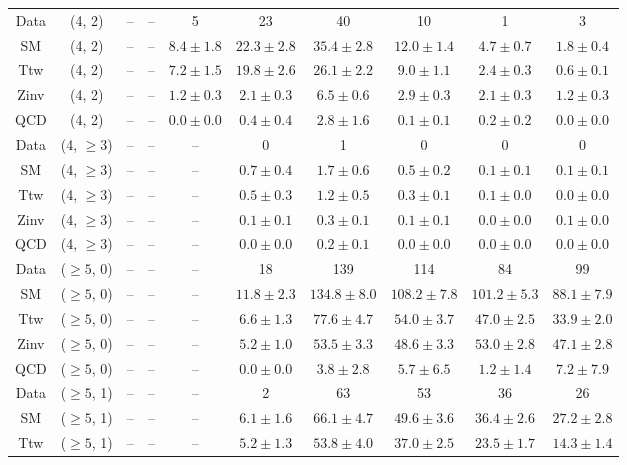 \begin{table}[h!]
{\begin{tabular}{cccccccccc}
	Data & (4, 2) & -- & -- & 5 & 23 & 40 & 10 & 1 & 3 \\[0.5ex] 
	SM & (4, 2) & -- & -- & $8.4\pm 1.8$ & $22.3\pm 2.8$ & $35.4\pm 2.8$ & $12.0\pm 1.4$ & $4.7\pm 0.7$ & $1.8\pm 0.4$ \\[0.5ex] 
	Ttw & (4, 2) & -- & -- & $7.2\pm 1.5$ & $19.8\pm 2.6$ & $26.1\pm 2.2$ & $9.0\pm 1.1$ & $2.4\pm 0.3$ & $0.6\pm 0.1$ \\[0.5ex] 
	Zinv & (4, 2) & -- & -- & $1.2\pm 0.3$ & $2.1\pm 0.3$ & $6.5\pm 0.6$ & $2.9\pm 0.3$ & $2.1\pm 0.3$ & $1.2\pm 0.3$ \\[0.5ex] 
	QCD & (4, 2) & -- & -- & $0.0\pm 0.0$ & $0.4\pm 0.4$ & $2.8\pm 1.6$ & $0.1\pm 0.1$ & $0.2\pm 0.2$ & $0.0\pm 0.0$ \\[0.5ex] 
	Data & (4, $\ge3$) & -- & -- & -- & 0 & 1 & 0 & 0 & 0 \\[0.5ex] 
	SM & (4, $\ge3$) & -- & -- & -- & $0.7\pm 0.4$ & $1.7\pm 0.6$ & $0.5\pm 0.2$ & $0.1\pm 0.1$ & $0.1\pm 0.1$ \\[0.5ex] 
	Ttw & (4, $\ge3$) & -- & -- & -- & $0.5\pm 0.3$ & $1.2\pm 0.5$ & $0.3\pm 0.1$ & $0.1\pm 0.0$ & $0.0\pm 0.0$ \\[0.5ex] 
	Zinv & (4, $\ge3$) & -- & -- & -- & $0.1\pm 0.1$ & $0.3\pm 0.1$ & $0.1\pm 0.1$ & $0.0\pm 0.0$ & $0.1\pm 0.0$ \\[0.5ex] 
	QCD & (4, $\ge3$) & -- & -- & -- & $0.0\pm 0.0$ & $0.2\pm 0.1$ & $0.0\pm 0.0$ & $0.0\pm 0.0$ & $0.0\pm 0.0$ \\[0.5ex] 
	Data & ($\ge5$, 0) & -- & -- & -- & 18 & 139 & 114 & 84 & 99 \\[0.5ex] 
	SM & ($\ge5$, 0) & -- & -- & -- & $11.8\pm 2.3$ & $134.8\pm 8.0$ & $108.2\pm 7.8$ & $101.2\pm 5.3$ & $88.1\pm 7.9$ \\[0.5ex] 
	Ttw & ($\ge5$, 0) & -- & -- & -- & $6.6\pm 1.3$ & $77.6\pm 4.7$ & $54.0\pm 3.7$ & $47.0\pm 2.5$ & $33.9\pm 2.0$ \\[0.5ex] 
	Zinv & ($\ge5$, 0) & -- & -- & -- & $5.2\pm 1.0$ & $53.5\pm 3.3$ & $48.6\pm 3.3$ & $53.0\pm 2.8$ & $47.1\pm 2.8$ \\[0.5ex] 
	QCD & ($\ge5$, 0) & -- & -- & -- & $0.0\pm 0.0$ & $3.8\pm 2.8$ & $5.7\pm 6.5$ & $1.2\pm 1.4$ & $7.2\pm 7.9$ \\[0.5ex] 
	Data & ($\ge5$, 1) & -- & -- & -- & 2 & 63 & 53 & 36 & 26 \\[0.5ex] 
	SM & ($\ge5$, 1) & -- & -- & -- & $6.1\pm 1.6$ & $66.1\pm 4.7$ & $49.6\pm 3.6$ & $36.4\pm 2.6$ & $27.2\pm 2.8$ \\[0.5ex] 
	Ttw & ($\ge5$, 1) & -- & -- & -- & $5.2\pm 1.3$ & $53.8\pm 4.0$ & $37.0\pm 2.5$ & $23.5\pm 1.7$ & $14.3\pm 1.4$ \\[0.5ex] 

\end{tabular}}
\end{table}
